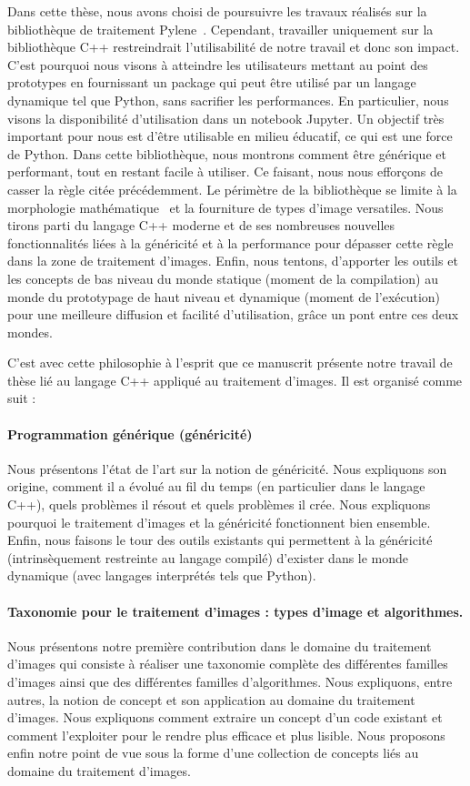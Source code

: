 Dans cette thèse, nous avons choisi de poursuivre les travaux réalisés sur la bibliothèque de traitement
Pylene~\parencite{carlinet.2018.pylena}. Cependant, travailler uniquement sur la bibliothèque C++ restreindrait
l'utilisabilité de notre travail et donc son impact. C'est pourquoi nous visons à atteindre les utilisateurs mettant au
point des prototypes en fournissant un package qui peut être utilisé par un langage dynamique tel que Python, sans
sacrifier les performances. En particulier, nous visons la disponibilité d'utilisation dans un notebook Jupyter. Un
objectif très important pour nous est d'être utilisable en milieu éducatif, ce qui est une force de Python. Dans cette
bibliothèque, nous montrons comment être générique et performant, tout en restant facile à utiliser. Ce faisant, nous
nous efforçons de casser la règle citée précédemment. Le périmètre de la bibliothèque se limite à la morphologie
mathématique~\parencite{najman.2013.mathematical,geraud.2010.book} et la fourniture de types d'image versatiles. Nous
tirons parti du langage C++ moderne et de ses nombreuses nouvelles fonctionnalités liées à la généricité et à la
performance pour dépasser cette règle dans la zone de traitement d'images. Enfin, nous tentons, d'apporter les outils et
les concepts de bas niveau du monde statique (moment de la compilation) au monde du prototypage de haut niveau et
dynamique (moment de l'exécution) pour une meilleure diffusion et facilité d'utilisation, grâce un pont entre ces deux
mondes.

C'est avec cette philosophie à l'esprit que ce manuscrit présente notre travail de thèse lié au langage C++ appliqué au
traitement d'images. Il est organisé comme suit :

\paragraph{Programmation générique (généricité)} Nous présentons l'état de l'art sur la notion de généricité. Nous
expliquons son origine, comment il a évolué au fil du temps (en particulier dans le langage C++), quels problèmes il
résout et quels problèmes il crée. Nous expliquons pourquoi le traitement d'images et la généricité fonctionnent bien
ensemble. Enfin, nous faisons le tour des outils existants qui permettent à la généricité (intrinsèquement restreinte au
langage compilé) d'exister dans le monde dynamique (avec langages interprétés tels que Python).

\paragraph{Taxonomie pour le traitement d'images : types d'image et algorithmes.} Nous présentons notre première
contribution dans le domaine du traitement d'images qui consiste à réaliser une taxonomie complète des différentes
familles d'images ainsi que des différentes familles d'algorithmes. Nous expliquons, entre autres, la notion de concept
et son application au domaine du traitement d'images. Nous expliquons comment extraire un concept d'un code existant et
comment l'exploiter pour le rendre plus efficace et plus lisible. Nous proposons enfin notre point de vue sous la forme
d'une collection de concepts liés au domaine du traitement d'images.

